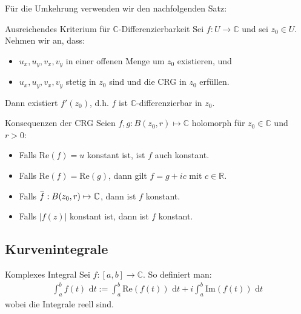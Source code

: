 \documentclass[a4paper,10pt]{article}
\def\R{\mathbb{R}}
\def\C{\mathbb{C}}
\def\dt{\text{ d}t}
\def\Re{\text{Re}}
\def\Im{\text{Im}}
\newcommand{\overbar}[1]{\mkern 1.5mu\overline{\mkern-1.5mu#1\mkern-1.5mu}\mkern 1.5mu}
\begin{document}
Für die Umkehrung verwenden wir den nachfolgenden Satz:

\begin{mainbox}{Ausreichendes Kriterium für $\C$-Differenzierbarkeit}
  Sei \(f \colon U \to \mathbb{C}\) und sei \(z_0 \in U\). Nehmen wir an, dass:
  \begin{itemize}
    \item \(u_x,u_y,v_x,v_y\) in einer offenen Menge um \(z_0\) existieren, und
    \item \(u_x,u_y,v_x,v_y\) stetig in \(z_0\) sind und die CRG in \(z_0\) erfüllen.
  \end{itemize}
  Dann existiert \(f'(z_0)\), d.h. \(f\) ist \(\mathbb{C}\)-differenzierbar in \(z_0\).
\end{mainbox}

\begin{subbox}{Konsequenzen der CRG}
  Seien $f, g: B(z_0, r) \mapsto \C$ holomorph für $z_0 \in \C$ und $r > 0$:
  \begin{itemize}
    \item Falls $\Re(f) = u$ konstant ist, ist $f$ auch konstant.
    \item Falls $\Re(f) = \Re(g)$, dann gilt $f = g + ic$ mit $c \in \R$.
    \item Falls $\overbar{f}: B(z_0, r) \mapsto \C$, dann ist $f$ konstant.
    \item Falls $|f(z)|$ konstant ist, dann ist $f$ konstant.
  \end{itemize}
\end{subbox}

\subsection{Kurvenintegrale}

\begin{mainbox}{Komplexes Integral}
  Sei \(f \colon [a,b] \to \mathbb{C}\). So definiert man:
  \begin{align*}
    \int_a^b f(t) \dt:=\int_a^b \Re(f(t)) \dt + i \int_a^b \Im(f(t)) \dt 
  \end{align*}
  wobei die Integrale reell sind.
\end{mainbox}
\end{document}

